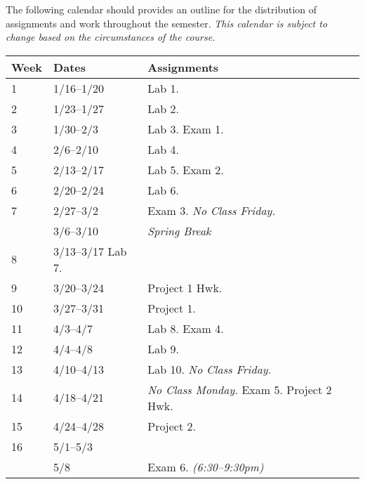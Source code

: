 \documentclass[10pt]{article}
\begin{document}
The following calendar should provides an outline for the distribution of assignments and work throughout the semester.  \textit{This calendar is subject to change based on the circumstances of the course.}
\begin{center}
\begin{tabular}{lll}
Week & Dates & Assignments \\ \toprule
1 & 1/16--1/20 &  Lab 1.  \\
2 & 1/23--1/27 & Lab 2. \\
3 & 1/30--2/3 & Lab 3. Exam 1. \\
4 & 2/6--2/10 & Lab 4. \\
5 & 2/13--2/17 & Lab 5. Exam 2. \\
6 & 2/20--2/24 & Lab 6.  \\
7 & 2/27--3/2 & Exam 3. \textit{No Class Friday.} \\
 & 3/6--3/10 & \textit{Spring Break} \\
8 & 3/13--3/17 Lab 7. &  \\
9 & 3/20--3/24 & Project 1 Hwk.  \\
10 & 3/27--3/31 & Project 1. \\
11 & 4/3--4/7 & Lab 8. Exam 4. \\
12 & 4/4--4/8 & Lab 9.   \\
13 & 4/10--4/13 & Lab 10. \textit{No Class Friday.}   \\
14 & 4/18--4/21 & \textit{No Class Monday.}  Exam 5. Project 2 Hwk. \\
15 & 4/24--4/28 & Project 2. \\
16 & 5/1--5/3 &   \\ \midrule
  & 5/8 & Exam 6. \textit{(6:30--9:30pm)}  \\
\end{tabular}
\end{center}
\end{document}
